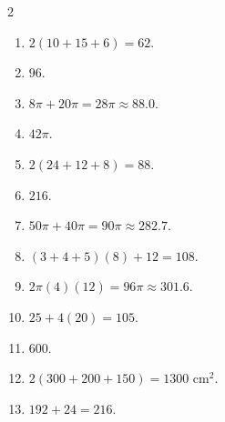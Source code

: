 \documentclass[11pt]{article}
\begin{document}
\begin{keybox}
\begin{multicols}{2}
\small
\begin{enumerate}[leftmargin=*,itemsep=3pt]
  \item $2(10+15+6)=62$.
  \item $96$.
  \item $8\pi+20\pi=28\pi\approx88.0$.
  \item $42\pi$.
  \item $2(24+12+8)=88$.
  \item $216$.
  \item $50\pi+40\pi=90\pi\approx282.7$.
  \item $(3+4+5)(8)+12=108$.
  \item $2\pi(4)(12)=96\pi\approx301.6$.
  \item $25+4(20)=105$.
  \item $600$.
  \item $2(300+200+150)=1300$ cm$^2$.
  \item $192+24=216$.
\end{enumerate}
\end{multicols}
\end{keybox}
\end{document}

